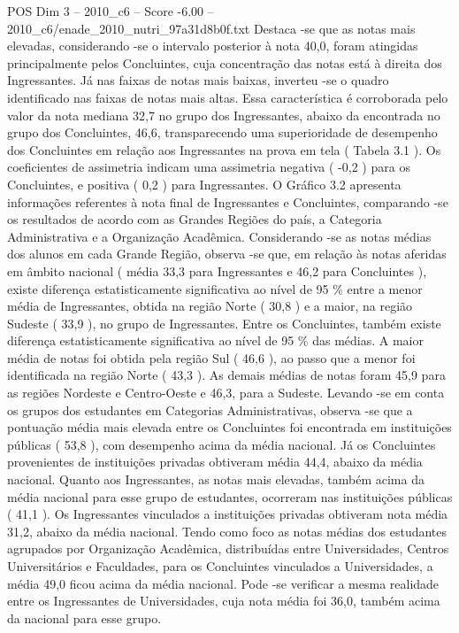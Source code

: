 \begin{textsample}{POS Dim 3 – 2010\_c6 – Score -6.00 – 2010\_c6/enade\_2010\_nutri\_97a31d8b0f.txt}
Destaca -se que as notas mais elevadas, considerando -se o intervalo posterior à nota 40,0, foram atingidas principalmente pelos Concluintes, cuja concentração das notas está à direita dos Ingressantes.
Já nas faixas de notas mais baixas, inverteu -se o quadro identificado nas faixas de notas mais altas.
Essa característica é corroborada pelo valor da nota mediana 32,7 no grupo dos Ingressantes, abaixo da encontrada no grupo dos Concluintes, 46,6, transparecendo uma superioridade de desempenho dos Concluintes em relação aos Ingressantes na prova em tela ( Tabela 3.1 ).
Os coeficientes de assimetria indicam uma assimetria negativa ( -0,2 ) para os Concluintes, e positiva ( 0,2 ) para Ingressantes.
O Gráfico 3.2 apresenta informações referentes à nota final de Ingressantes e Concluintes, comparando -se os resultados de acordo com as Grandes Regiões do país, a Categoria Administrativa e a Organização Acadêmica.
Considerando -se as notas médias dos alunos em cada Grande Região, observa -se que, em relação às notas aferidas em âmbito nacional ( média 33,3 para Ingressantes e 46,2 para Concluintes ), existe diferença estatisticamente significativa ao nível de 95 \% entre a menor média de Ingressantes, obtida na região Norte ( 30,8 ) e a maior, na região Sudeste ( 33,9 ), no grupo de Ingressantes.
Entre os Concluintes, também existe diferença estatisticamente significativa ao nível de 95 \% das médias.
A maior média de notas foi obtida pela região Sul ( 46,6 ), ao passo que a menor foi identificada na região Norte ( 43,3 ).
As demais médias de notas foram 45,9 para as regiões Nordeste e Centro-Oeste e 46,3, para a Sudeste.
Levando -se em conta os grupos dos estudantes em Categorias Administrativas, observa -se que a pontuação média mais elevada entre os Concluintes foi encontrada em instituições públicas ( 53,8 ), com desempenho acima da média nacional.
Já os Concluintes provenientes de instituições privadas obtiveram média 44,4, abaixo da média nacional.
Quanto aos Ingressantes, as notas mais elevadas, também acima da média nacional para esse grupo de estudantes, ocorreram nas instituições públicas ( 41,1 ).
Os Ingressantes vinculados a instituições privadas obtiveram nota média 31,2, abaixo da média nacional.
Tendo como foco as notas médias dos estudantes agrupados por Organização Acadêmica, distribuídas entre Universidades, Centros Universitários e Faculdades, para os Concluintes vinculados a Universidades, a média 49,0 ficou acima da média nacional.
Pode -se verificar a mesma realidade entre os Ingressantes de Universidades, cuja nota média foi 36,0, também acima da nacional para esse grupo.

\end{textsample}
